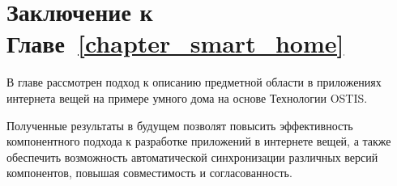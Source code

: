 \section*{Заключение к Главе~\ref{chapter_smart_home}}

В главе рассмотрен подход к описанию предметной области в приложениях интернета вещей на примере умного дома на основе Технологии OSTIS.

Полученные результаты в будущем позволят повысить эффективность компонентного подхода к разработке приложений в интернете вещей, а также обеспечить возможность автоматической синхронизации различных версий компонентов, повышая совместимость и согласованность.